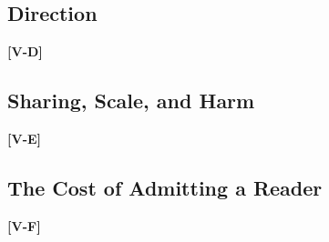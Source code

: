 \documentclass[letterpaper, 10 pt, conference]{ieeeconf}
\newcommand{\todo}[1]{\textbf{[#1]}}
\begin{document}
\subsection{Direction}
\label{sec:results:direction}
\todo{V-D}

\subsection{Sharing, Scale, and Harm}
\label{sec:results:sharing}
\todo{V-E}

\subsection{The Cost of Admitting a Reader}
\label{sec:results:admission}
\todo{V-F}
\end{document}
